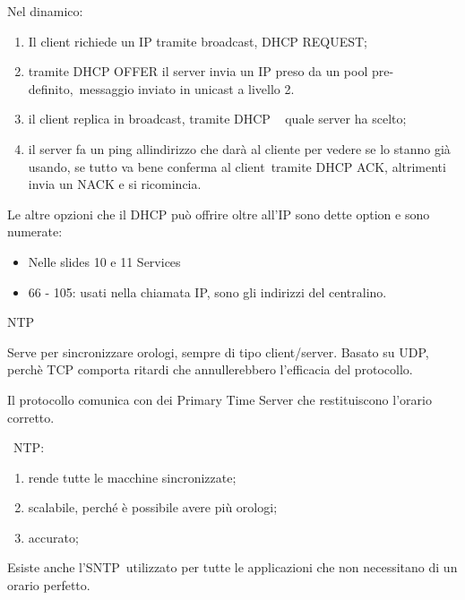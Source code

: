 \documentclass[
]{article}
\providecommand{\tightlist}{%
  \setlength{\itemsep}{0pt}\setlength{\parskip}{0pt}}
\begin{document}
{}

{Nel dinamico:}

\begin{enumerate}
\tightlist
\item
  {Il client richiede un IP tramite broadcast, DHCP REQUEST;}
\item
  {tramite DHCP OFFER il server invia un IP preso da un pool
  }{pre-definito,}{~messaggio inviato in unicast a livello 2.}
\item
  {il client replica in broadcast, tramite DHCP ~ quale server ha
  scelto;}
\item
  {il server fa un ping all\textquotesingle indirizzo che darà al
  cliente per vedere se lo stanno già usando, se tutto va bene conferma
  al }{client}{~tramite DHCP ACK, altrimenti invia un NACK e si
  ricomincia.}
\end{enumerate}

{}

{Le altre opzioni che il DHCP può offrire oltre all'IP sono dette option
e sono numerate:}

\begin{itemize}
\tightlist
\item
  {Nelle slides 10 e 11 Services}
\item
  {66 - 105: usati nella chiamata IP, sono gli indirizzi del
  centralino.}
\end{itemize}

{}

{NTP}

{Serve per sincronizzare orologi, sempre di tipo client/server. Basato
su UDP, perchè TCP comporta ritardi che annullerebbero l'efficacia del
protocollo.}

{}

{Il protocollo comunica con dei Primary Time Server che restituiscono
l'orario corretto.}

{}

{~NTP:}

\begin{enumerate}
\tightlist
\item
  {rende tutte le macchine sincronizzate;}
\item
  {scalabile, perché è possibile avere più orologi;}
\item
  {accurato;}
\end{enumerate}

{}

{Esiste anche }{l'SNTP}{~utilizzato per tutte le applicazioni che non
necessitano di un orario perfetto.}
\end{document}
